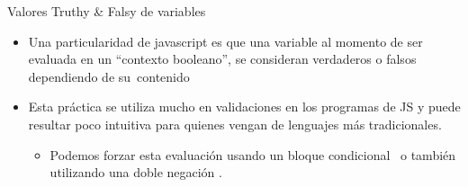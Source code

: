 \documentclass[aspectratio=43,10pt,t]{beamer}
\begin{document}
\begin{frame}{Valores Truthy \& Falsy de variables}\relax
\begingroup
{}
\begin{itemize}
  \item Una particularidad de javascript es que una variable al momento de ser evaluada en un “contexto booleano”, se consideran verdaderos o falsos dependiendo de su~contenido
  \item Esta práctica se utiliza mucho en validaciones en los programas de JS y puede resultar poco intuitiva para quienes vengan de lenguajes más tradicionales.
  \begin{itemize}
    \item Podemos forzar esta evaluación usando un bloque condicional~ o también utilizando una doble negación .
  \end{itemize}
\end{itemize}
\endgroup
\end{frame}
\end{document}
